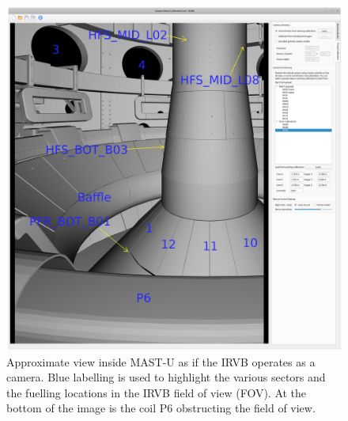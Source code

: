 \begin{figure}
	\centering
	\includegraphics[trim={30 30 450 90},clip,width=0.5\linewidth]{Chapters/chapter2/figs/calcam4.png}
	\caption{Approximate view inside MAST-U as if the IRVB operates as a camera. Blue labelling is used to highlight the various sectors and the fuelling locations in the IRVB field of view (FOV). At the bottom of the image is the coil P6 obstructing the field of view.}
	\label{fig:calcam}
\end{figure}

